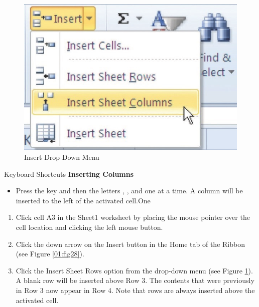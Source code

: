 \begin{figure}[H]
	\centering
	\includegraphics[width=\maxwidth{.95\linewidth}]{gfx/ch01_fig29}
	\caption{Insert Drop-Down Menu}
	\label{01:fig29}
\end{figure}

\begin{center}
	\begin{shtcutbox}{Keyboard Shortcuts}
		\textbf{Inserting Columns}
		\\
		\begin{itemize}
			\setlength{\itemsep}{0pt}
			\setlength{\parskip}{0pt}
			\setlength{\parsep}{0pt}
			
			\item Press the  key and then the letters , , and  one at a time. A column will be inserted to the left of the activated cell.One
			
		\end{itemize}
	\end{shtcutbox}
\end{center}

\begin{enumerate}[resume]
	\item Click cell \textsf{A3} in the Sheet1 worksheet by placing the mouse pointer over the cell location and clicking the left mouse button.
	\item Click the down arrow on the Insert button in the Home tab of the Ribbon (see Figure \ref{01:fig28}).
	\item Click the Insert Sheet Rows option from the drop-down menu (see Figure \ref{01:fig29}). A blank row will be inserted above Row 3. The contents that were previously in Row 3 now appear in Row 4. Note that rows are always inserted above the activated cell.
\end{enumerate}

